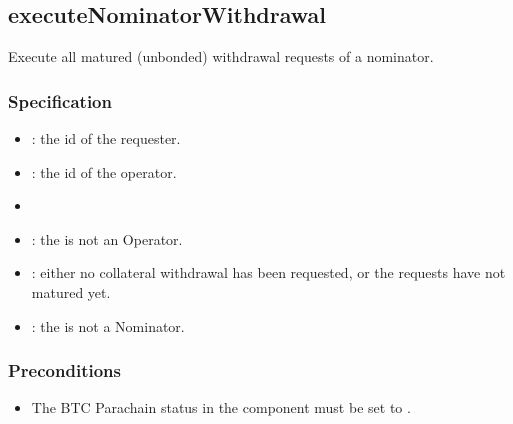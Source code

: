 \documentclass[a4paper,10pt,english]{sphinxmanual}
\begin{document}
\subsection{executeNominatorWithdrawal}
\label{\detokenize{spec/nomination:executenominatorwithdrawal}}\label{\detokenize{spec/nomination:id29}}
Execute all matured (unbonded) withdrawal requests of a nominator.


\subsubsection{Specification}
\label{\detokenize{spec/nomination:id30}}


\begin{itemize}
\item {} 
: the id of the requester.

\item {} 
: the id of the operator.

\end{itemize}

\begin{itemize}
\item {} 

\end{itemize}

\begin{itemize}
\item {} 
: the  is not an Operator.

\item {} 
: either no collateral withdrawal has been requested, or the requests have not matured yet.

\item {} 
: the  is not a Nominator.

\end{itemize}


\subsubsection{Preconditions}
\label{\detokenize{spec/nomination:id31}}\begin{itemize}
\item {} 
The BTC Parachain status in the {\hyperref[\detokenize{spec/security:security}]{}} component must be set to .

\end{itemize}
\end{document}
